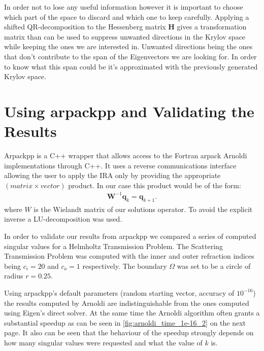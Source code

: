 \documentclass[a4paper, oneside]{thirdparty_stylesheets/discothesis}
\begin{document}
In order not to lose any useful information however it is important to choose which part of the space to discard and which one to keep carefully.
Applying a shifted QR-decomposition to the Hessenberg matrix $\mathbf{H}$ gives a transformation matrix than can be used to suppress unwanted directions in the Krylov space while keeping the ones we are interested in.
Unwanted directions being the ones that don't contribute to the span of the Eigenvectors we are looking for.
In order to know what this span could be it's approximated with the previously generated Krylov space.

\section{Using arpackpp and Validating the Results}\label{sec:first_results}
Arpackpp is a C++ wrapper that allows access to the Fortran arpack\cite{arpackweb} Arnoldi implementations through C++.
It uses a reverse communications interface allowing the user to apply the IRA only by providing the appropriate $(matrix\times vector)$ product.
In our case this product would be of the form:
\begin{align}
	\mathbf{W}^{-1} \mathbf{q}_k = \mathbf{q}_{k+1}.
\end{align}
where $W$ is the Wielandt matrix of our solutions operator.
To avoid the explicit inverse a LU-decomposition was used.

In order to validate our results from arpackpp we compared a series of computed singular values for a Helmholtz Transmission Problem.
The Scattering Transmission Problem was computed with the inner and outer refraction indices being $c_i=20$ and $c_o=1$ respectively.
The boundary $\Omega$ was set to be a circle of radius $r=0.25$.

Using arpackpp's default parameters (random starting vector, accuracy of $10^{-16}$) the results computed by Arnoldi are indistinguishable from the ones computed using Eigen's direct solver.
At the same time the Arnoldi algorithm often grants a substantial speedup as can be seen in \ref{fig:arnoldi_time_1e-16_2} on the next page.
It also can be seen that the behaviour of the speedup strongly depends on how many singular values were requested and what the value of $k$ is.
\end{document}
